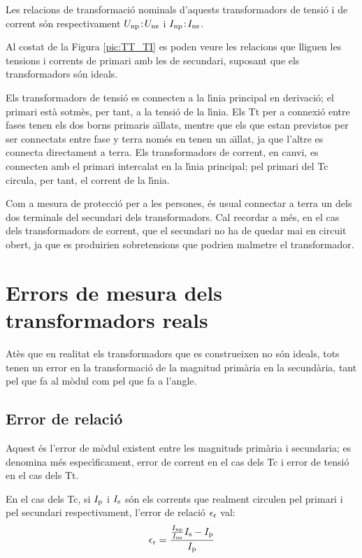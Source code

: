 Les relacions de transformaci\'{o} nominals d'aquests transformadors de
tensi\'{o} i de corrent s\'{o}n respectivament $U_\mathrm{np}\!:\!U_\mathrm{ns}$ i
$I_\mathrm{np}\!:\!I_\mathrm{ns}$.

Al costat de la Figura
\vref{pic:TT_TI} es poden veure les relacions que lliguen les
tensions i corrents de primari amb les de secundari, suposant que
els transformadors s\'{o}n ideals.


Els transformadors de tensi\'{o} es connecten a la l\'{\i}nia principal en
derivaci\'{o}; el  primari est\`{a} sotm\`{e}s, per tant, a la tensi\'{o} de la
l\'{\i}nia. Els Tt per a connexi\'{o} entre fases tenen els dos borns
primaris a\"{\i}llats, mentre que els que estan previstos per ser
connectats entre fase y terra nom\'{e}s en tenen un a\"{\i}llat, ja que
l'altre es connecta directament a terra. Els transformadors de
corrent, en canvi, es connecten amb el primari intercalat en la
l\'{\i}nia principal;  pel primari del Tc circula, per tant, el corrent
 de la l\'{\i}nia.

 Com a mesura de protecci\'{o} per a les persones, \'{e}s usual
connectar a terra un dels dos terminals del secundari dels
transformadors. Cal recordar a m\'{e}s, en el cas dels transformadors de
corrent, que el secundari no ha de quedar mai en circuit obert, ja
que es produirien sobretensions que podrien malmetre el
transformador.

\section{Errors de mesura dels transformadors reals}

At\`{e}s que en realitat els transformadors que es construeixen no s\'{o}n
ideals, tots tenen un error en la transformaci\'{o} de la magnitud
prim\`{a}ria en la secund\`{a}ria, tant pel que fa al m\`{o}dul com pel que fa
a l'angle.

\subsection{Error de relaci\'{o}}

Aquest \'{e}s l'error de m\`{o}dul existent entre les magnituds prim\`{a}ria i
secundaria; es denomina m\'{e}s espec\'{\i}ficament, error de corrent en el
cas dels Tc i error de tensi\'{o} en el cas dels Tt.

En el cas dels Tc, si $I_\mathrm{p}$ i $I_\mathrm{s}$ s\'{o}n els corrents que
realment circulen pel primari i pel secundari respectivament,
l'error de relaci\'{o} $\epsilon_\mathrm{r}$ val:
\begin{equation}
    \epsilon_\mathrm{r} = \frac{\frac{I_\mathrm{np}}{I_\mathrm{ns}} I_\mathrm{s} - I_\mathrm{p}} {I_\mathrm{p}}
\end{equation}

